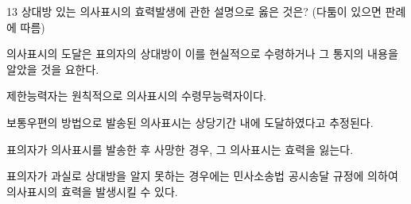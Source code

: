 \begin{question}{13}
상대방 있는 의사표시의 효력발생에 관한 설명으로 옳은 것은? (다툼이 있으면 판례에 따름)
\begin{choices}
  \item 의사표시의 도달은 표의자의 상대방이 이를 현실적으로 수령하거나 그 통지의 내용을 알았을 것을 요한다.
  \item 제한능력자는 원칙적으로 의사표시의 수령무능력자이다.
  \item 보통우편의 방법으로 발송된 의사표시는 상당기간 내에 도달하였다고 추정된다.
  \item 표의자가 의사표시를 발송한 후 사망한 경우, 그 의사표시는 효력을 잃는다.
  \item 표의자가 과실로 상대방을 알지 못하는 경우에는 민사소송법 공시송달 규정에 의하여 의사표시의 효력을 발생시킬 수 있다.
\end{choices}
\end{question}
